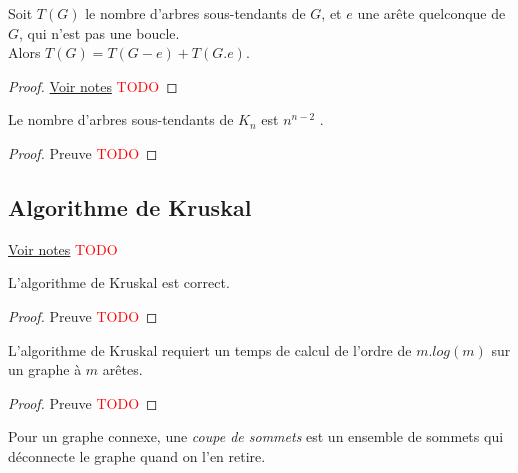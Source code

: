 \begin{myform}   
  Soit $T(G)$ le nombre d’arbres sous-tendants de $G$, et $e$ une arête quelconque de $G$, qui n’est pas une boucle. \\
  Alors $T(G) = T(G − e) + T (G.e)$.
  \begin{proof}
     \href{https://dl.dropboxusercontent.com/u/44092863/Graph_Theory_Romain_Capron.pdf}{Voir notes} \textcolor{red}{TODO}
  \end{proof}
\end{myform}

\begin{mytheo}   
  Le nombre d’arbres sous-tendants de $K_n$ est $n^{n−2}$ .
  \begin{proof}
     Preuve \textcolor{red}{TODO}
  \end{proof}
\end{mytheo}

\subsection{Algorithme de Kruskal}
\begin{myalgo}
\end{myalgo}

\begin{myexem}
  \href{https://dl.dropboxusercontent.com/u/44092863/Graph_Theory_Romain_Capron.pdf}{Voir notes} \textcolor{red}{TODO}
\end{myexem}

\begin{mytheo}
  L’algorithme de Kruskal est correct.
  \begin{proof}
     Preuve \textcolor{red}{TODO}
  \end{proof}
\end{mytheo}

\begin{mytheo} 
  L’algorithme de Kruskal requiert un temps de calcul de l’ordre de $m.log(m)$ sur un graphe à $m$ arêtes.
  \begin{proof}
     Preuve \textcolor{red}{TODO}
  \end{proof}
\end{mytheo}

\begin{mydef}
  Pour un graphe connexe, une \emph{coupe de sommets} est un ensemble de sommets qui déconnecte le graphe quand on l’en retire.
\end{mydef}

